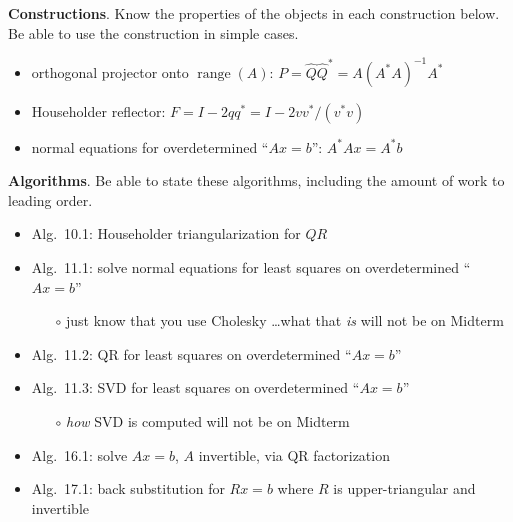 \documentclass[11pt]{amsart}
\newcommand{\range}{\operatorname{range}}
\begin{document}
\medskip\noindent \textbf{Constructions}.  Know the properties of the objects in each construction below.  Be able to use the construction in simple cases.

\begin{itemize}
\item orthogonal projector onto $\range(A)$: \quad $P=\hat Q\hat Q^* = A\left(A^* A\right)^{-1} A^*$
\item Householder reflector: \quad $F = I - 2 q q^* = I - 2 v v^* / (v^* v)$
\item normal equations for overdetermined ``$Ax=b$'': \quad $A^* A x = A^* b$
\end{itemize}

\medskip\noindent \textbf{Algorithms}. Be able to state these algorithms, including the amount of work to leading order.
\begin{itemize}
\item Alg.~10.1: Householder triangularization for $QR$
\item Alg.~11.1: solve normal equations for least squares on overdetermined ``$Ax=b$''
    \begin{itemize}
    \item[$\circ$] just know that you use Cholesky \dots what that \emph{is} will not be on Midterm
    \end{itemize}
\item Alg.~11.2: QR for least squares on overdetermined ``$Ax=b$''
\item Alg.~11.3: SVD for least squares on overdetermined ``$Ax=b$''
    \begin{itemize}
    \item[$\circ$] \emph{how} SVD is computed will not be on Midterm
    \end{itemize}
\item Alg.~16.1: solve $Ax=b$, $A$ invertible, via QR factorization
\item Alg.~17.1: back substitution for $Rx=b$ where $R$ is upper-triangular and invertible
\end{itemize}
\end{document}
